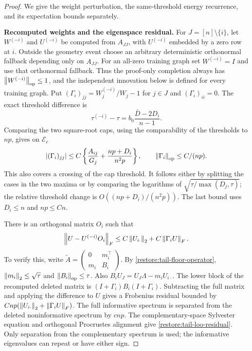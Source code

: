 \begin{proof}
We give the weight perturbation, the same-threshold energy recurrence,
and its expectation bounds separately.

\medskip\noindent\textbf{Recomputed weights and the eigenspace residual.}
For $J=[n]\setminus\{i\}$, let $W^{(-i)}$ and $U^{(-i)}$ be
computed from $A_{JJ}$, with $U^{(-i)}$ embedded by a zero row at $i$.
Outside the geometry event choose an arbitrary deterministic
orthonormal fallback depending only on $A_{JJ}$.
For an all-zero training graph set $W^{(-i)}=I$ and use that
orthonormal fallback. Thus the proof-only completion always has
$\left\lVert W^{(-i)}\right\rVert_{\mathrm{op}}\le1$, and the independent innovation below
is defined for every training graph.
Put $(\Gamma_i)_{jj}=W_j^{(-i)}/W_j-1$ for $j\in J$ and
$(\Gamma_i)_{ii}=0$.
The exact threshold difference is
\[
 \tau^{(-i)}-\tau
 =b_0\frac{\bar D-2D_i}{n-1}.
\]
Comparing the two square-root caps, using the comparability of the
thresholds to ${np}$, gives on $\mathcal E_r$
\begin{equation}
 |(\Gamma_i)_{jj}|
 \le C\left\{\frac{A_{ij}}{G_j}
             +\frac{{np}+D_i}{{n^2p}}\right\},
 \qquad \left\lVert\Gamma_i\right\rVert_{\mathrm{op}}\le C/(np).
 \label{restore:tail-weight-change}
\end{equation}
This also covers a crossing of the cap threshold. It follows either
by splitting the cases in the two maxima or by comparing the logarithms
of $\sqrt{\tau/\max(D_j,\tau)}$; the relative threshold change is
$O(({np}+D_i)/({n^2p}))$.  The last bound uses $D_i\le n$ and ${np}\le Cn$.

There is an orthogonal matrix $O_i$ such that
\begin{equation}
 \left\lVert U-U^{(-i)}O_i\right\rVert_F
 \le C\left\lVert U_{i\cdot}\right\rVert_2+C\left\lVert\Gamma_iU\right\rVert_F.
 \label{restore:tail-loo-residual}
\end{equation}
To verify this, write
$\widetilde A=\left(\begin{smallmatrix}0&m_i^\top\\m_i&B_i\end{smallmatrix}\right)$.
By \eqref{restore:tail-floor-operator},
$\left\lVert m_i\right\rVert_2\le\sqrt\tau$ and $\left\lVert B_i\right\rVert_{\mathrm{op}}\le\tau$.
Also $B_iU_J=U_J\Lambda-m_iU_{i\cdot}$.
The lower block of the recomputed deleted matrix is
$(I+\Gamma_i)B_i(I+\Gamma_i)$.
Subtracting the full matrix and applying the difference to $U$ gives
a Frobenius residual bounded by
$C{np}(\left\lVert U_{i\cdot}\right\rVert_2+\left\lVert\Gamma_iU\right\rVert_F)$.
The full informative spectrum is separated from the deleted
noninformative spectrum by $c{np}$.
The complementary-space Sylvester equation and orthogonal Procrustes
alignment give \eqref{restore:tail-loo-residual}.
Only separation from the complementary spectrum is used; the
informative eigenvalues can repeat or have either sign.


\end{proof}
